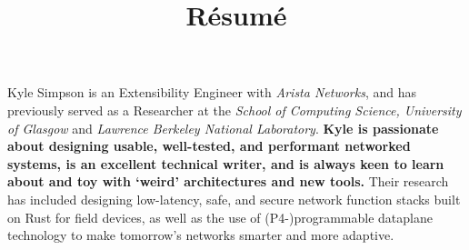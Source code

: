 \documentclass[10pt, a4paper]{moderncv}
\title{R\'{e}sum\'{e}}
\begin{document}
\nocite{*}

\setlength{\hintscolumnwidth}{1.5cm}
\setlength{\separatorcolumnwidth}{1em}
	
\makecvtitle
\vspace{-2.5em}

\begin{multicols*}{2}
\setlength{\maincolumnwidth}{\linewidth-\leftskip-\rightskip-\separatorcolumnwidth-\hintscolumnwidth}

Kyle Simpson is an Extensibility Engineer with \emph{Arista Networks}, and has previously served as a Researcher at the \emph{School of Computing Science, University of Glasgow} and \emph{Lawrence Berkeley National Laboratory}.
\textbf{Kyle is passionate about designing usable, well-tested, and performant networked systems, is an excellent technical writer, and is always keen to learn about and toy with `weird' architectures and new tools.}
Their research has included designing low-latency, safe, and secure network function stacks built on Rust for field devices, as well as the use of (P4-)programmable dataplane technology to make tomorrow's networks smarter and more adaptive.



%
%






\newcolumn




%



\end{multicols*}
\end{document}
